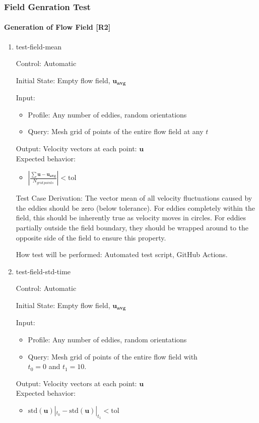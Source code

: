 \documentclass[12pt, titlepage]{article}
\begin{document}
\newpage
\subsubsection{Field Genration Test} \label{ST:FieldGen}
\paragraph{Generation of Flow Field [R2]}

\begin{enumerate}

  \item{test-field-mean\\}

  Control: Automatic
            
  Initial State: Empty flow field, $\mathbf{u_{avg}}$
            
  Input:
  \begin{itemize}
    \item Profile: Any number of eddies, random orientations
    \item Query: Mesh grid of points of the entire flow field at any $t$
  \end{itemize}
  Output: Velocity vectors at each point: $\mathbf{u}$\\
  Expected behavior:
  \begin{itemize}
    \item $|\frac{\sum\mathbf{u}-\mathbf{u_{avg}}}{N_{grid~points}}| < \text{tol}$
  \end{itemize}

  Test Case Derivation: The vector mean of all velocity fluctuations caused by the eddies should be zero (below tolerance). For eddies completely within the field, this should be inherently true as velocity moves in circles. For eddies partially outside the field boundary, they should be wrapped around to the opposite side of the field to ensure this property.
            
  How test will be performed: Automated test script, GitHub Actions.

  \item{test-field-std-time\\}

  Control: Automatic
            
  Initial State: Empty flow field, $\mathbf{u_{avg}}$
            
  Input:
  \begin{itemize}
    \item Profile: Any number of eddies, random orientations
    \item Query: Mesh grid of points of the entire flow field with \\ $t_0=0$ and $t_1=10$.
  \end{itemize}
  Output: Velocity vectors at each point: $\mathbf{u}$\\
  Expected behavior:
  \begin{itemize}
    \item $\text{std}(\mathbf{u})|_{t_0} - \text{std}(\mathbf{u})|_{t_1} < \text{tol}$
  \end{itemize}


\end{enumerate}
\end{document}
